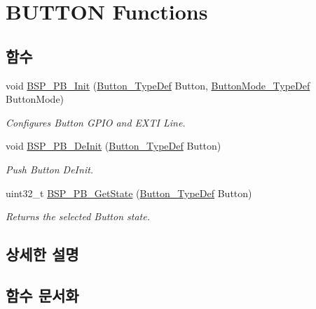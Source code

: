 \hypertarget{group___b_u_t_t_o_n___functions}{}\section{B\+U\+T\+T\+ON Functions}
\label{group___b_u_t_t_o_n___functions}
\subsection*{함수}
\begin{DoxyCompactItemize}
\item 
void \mbox{\hyperlink{group___b_u_t_t_o_n___functions_gad31c8db50a71c1f6dbfe132d72ba0bc6}{B\+S\+P\+\_\+\+P\+B\+\_\+\+Init}} (\mbox{\hyperlink{_lory_s_d_k__hw__conf_8h_a643816dfbad5c734fc25a29ce8d35bb1}{Button\+\_\+\+Type\+Def}} Button, \mbox{\hyperlink{_lory_s_d_k__hw__conf_8h_a48825b7c7d851c440ef8e808fd9d8f0a}{Button\+Mode\+\_\+\+Type\+Def}} Button\+Mode)
\begin{DoxyCompactList}\small\item\em Configures Button G\+P\+IO and E\+X\+TI Line. \end{DoxyCompactList}\item 
void \mbox{\hyperlink{group___b_u_t_t_o_n___functions_gac1bd746e7f6037d50ca3784ebe05686e}{B\+S\+P\+\_\+\+P\+B\+\_\+\+De\+Init}} (\mbox{\hyperlink{_lory_s_d_k__hw__conf_8h_a643816dfbad5c734fc25a29ce8d35bb1}{Button\+\_\+\+Type\+Def}} Button)
\begin{DoxyCompactList}\small\item\em Push Button De\+Init. \end{DoxyCompactList}\item 
uint32\+\_\+t \mbox{\hyperlink{group___b_u_t_t_o_n___functions_ga8f0978b6cffda9c67266ddfdb3a0abf7}{B\+S\+P\+\_\+\+P\+B\+\_\+\+Get\+State}} (\mbox{\hyperlink{_lory_s_d_k__hw__conf_8h_a643816dfbad5c734fc25a29ce8d35bb1}{Button\+\_\+\+Type\+Def}} Button)
\begin{DoxyCompactList}\small\item\em Returns the selected Button state. \end{DoxyCompactList}\end{DoxyCompactItemize}


\subsection{상세한 설명}


\subsection{함수 문서화}
\mbox{\label{group___b_u_t_t_o_n___functions_gac1bd746e7f6037d50ca3784ebe05686e}} 
